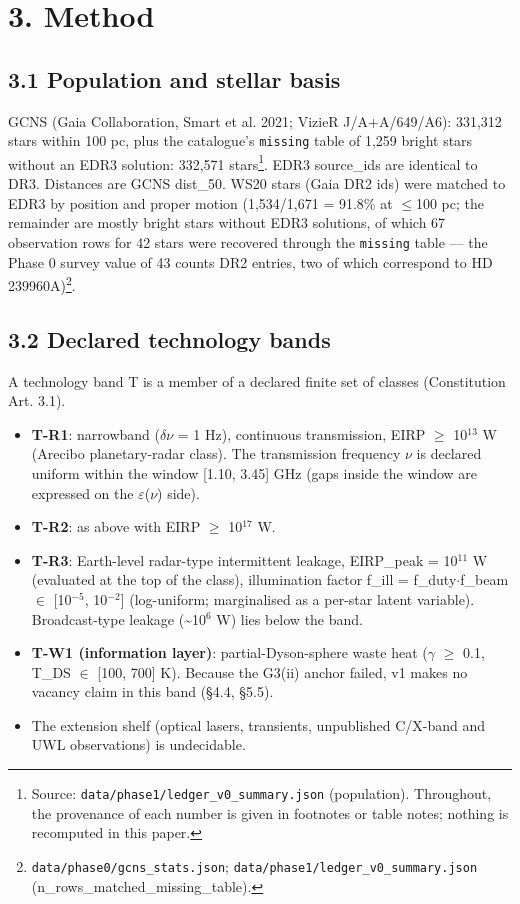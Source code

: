 \documentclass[11pt]{article}
\begin{document}
\section*{3. Method}

\subsection*{3.1 Population and stellar basis}
\noindent GCNS (Gaia Collaboration, Smart et al. 2021; VizieR J/A+A/649/A6): 331,312 stars within 100 pc, plus the catalogue's \texttt{missing} table of 1,259 bright stars without an EDR3 solution: 332,571 stars\footnote{Source: \texttt{data/phase1/ledger\_v0\_summary.json} (population). Throughout, the provenance of each number is given in footnotes or table notes; nothing is recomputed in this paper.}. EDR3 source\_ids are identical to DR3. Distances are GCNS dist\_50. WS20 stars (Gaia DR2 ids) were matched to EDR3 by position and proper motion (1,534/1,671 = 91.8\% at \(\leq\)100 pc; the remainder are mostly bright stars without EDR3 solutions, of which 67 observation rows for 42 stars were recovered through the \texttt{missing} table --- the Phase 0 survey value of 43 counts DR2 entries, two of which correspond to HD 239960A)\footnote{\texttt{data/phase0/gcns\_stats.json}; \texttt{data/phase1/ledger\_v0\_summary.json} (n\_rows\_matched\_missing\_table).}.\par\smallskip


\subsection*{3.2 Declared technology bands}
\noindent A technology band T is a member of a declared finite set of classes (Constitution Art. 3.1).\par\smallskip
\begin{itemize}\setlength{\itemsep}{1pt}
\item \textbf{T-R1}: narrowband (\(\delta\)\(\nu\) = 1 Hz), continuous transmission, EIRP \(\geq\) 10\(^{13}\) W (Arecibo planetary-radar class). The transmission frequency \(\nu\) is declared uniform within the window [1.10, 3.45] GHz (gaps inside the window are expressed on the \(\varepsilon\)(\(\nu\)) side).
\item \textbf{T-R2}: as above with EIRP \(\geq\) 10\(^{17}\) W.
\item \textbf{T-R3}: Earth-level radar-type intermittent leakage, EIRP\_peak = 10\(^{11}\) W (evaluated at the top of the class), illumination factor f\_ill = f\_duty\(\cdot\)f\_beam \(\in\) [10\(^{-5}\), 10\(^{-2}\)] (log-uniform; marginalised as a per-star latent variable). Broadcast-type leakage (\textasciitilde{}10\(^{6}\) W) lies below the band.
\item \textbf{T-W1 (information layer)}: partial-Dyson-sphere waste heat (\(\gamma\) \(\geq\) 0.1, T\_DS \(\in\) [100, 700] K). Because the G3(ii) anchor failed, v1 makes no vacancy claim in this band (\S{}4.4, \S{}5.5).
\item The extension shelf (optical lasers, transients, unpublished C/X-band and UWL observations) is undecidable.
\end{itemize}
\end{document}
